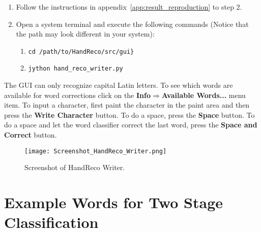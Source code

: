 \begin{enumerate}
 \item Follow the instructions in appendix~\ref{app:result_reproduction} to step 2.
 \item Open a system terminal and execute the following commands (Notice that the path may look different in your system):
 \begin{enumerate}
  \item \verb|cd /path/to/HandReco/src/gui}|
  \item \verb|jython hand_reco_writer.py|
 \end{enumerate}
\end{enumerate}

The GUI can only recognize capital Latin letters. 
To see which words are available for word corrections click on the \textbf{Info$\Rightarrow$Available Words...} menu item. 
To input a character, first paint the character in the paint area and then press the \textbf{Write Character} button. 
To do a space, press the \textbf{Space} button. 
To do a space and let the word classifier correct the last word, press the \textbf{Space and Correct} button.

    \begin{figure}[htb] 
      \begin{center}
	\leavevmode
	\texttt{[image: Screenshot\_HandReco\_Writer.png]}%
      \end{center}
      \caption{Screenshot of HandReco Writer.}
      \label{fig:hand_reco_writer_screenshot}
    \end{figure}


\section{Example Words for Two Stage Classification}\label{app:examples_sets_viterbi_classifier}

